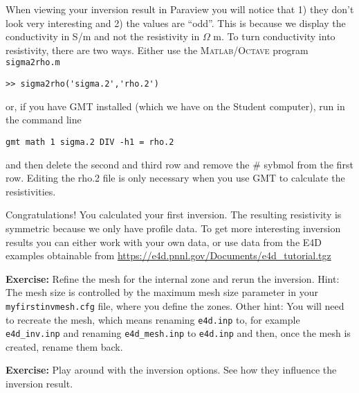 \documentclass[11pt]{article}
\begin{document}
When viewing your inversion result in Paraview you will notice that 1)
they don't look very interesting and 2) the values are ``odd''. This
is because we display the conductivity in S/m and not the resistivity
in $\Omega$ m. To turn conductivity into resistivity, there are two
ways. Either use the \textsc{Matlab}/\textsc{Octave} program
\verb+sigma2rho.m+

\qquad \verb+>> sigma2rho('sigma.2','rho.2')+

or, if you have GMT installed (which we have on
the Student computer), run in the command line

\qquad \verb#gmt math 1 sigma.2 DIV -h1 = rho.2#

and then delete the second and third row and remove the \# sybmol from
the first row. Editing the rho.2 file is only necessary when you use GMT to calculate
the resistivities.

Congratulations! You calculated your first inversion. The resulting
resistivity is symmetric because we only have profile data. To get
more interesting inversion results you can either work with your own
data, or use data from the E4D examples obtainable from \url{https://e4d.pnnl.gov/Documents/e4d_tutorial.tgz}

\textbf{Exercise:} Refine the mesh for the internal zone and rerun the
inversion. Hint: The mesh size is controlled by the maximum mesh size
parameter in your \verb+myfirstinvmesh.cfg+ file, where you define the
zones. Other hint: You will need to recreate the mesh, which means
renaming  \verb+e4d.inp+ to, for example \verb+e4d_inv.inp+ and
renaming \verb+e4d_mesh.inp+ to \verb+e4d.inp+ and then, once the mesh
is created, rename them back.

\textbf{Exercise:} Play around with the inversion options. See how
they influence the inversion result.
\end{document}
